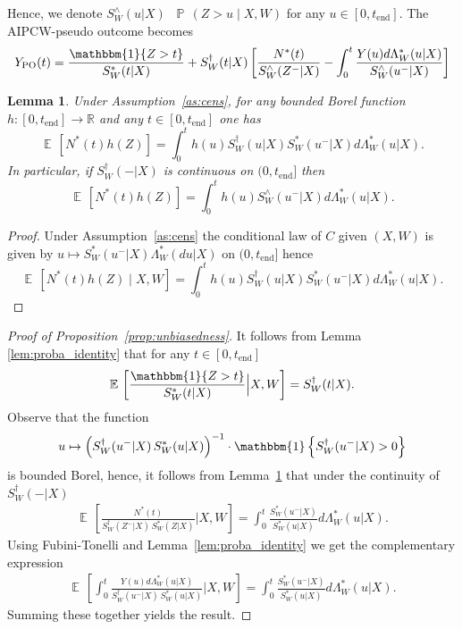 \documentclass{article}
\newtheorem{lemma}[theorem]{Lemma}
\DeclareMathOperator*{\eqdef }{\,\stackrel{\text{def}}{=}\,}
\DeclareMathOperator{\IDF}{\mathbbm{1}}%
\DeclareMathOperator{\EX}{\mathbb{E}\,}
\DeclareMathOperator{\PR}{\mathbb{P}\,}
\newcommand{\tend}{t_{\mathrm{end}}}
\newcommand{\R}{\mathbb{R}}
\newcommand{\YPO}{Y_{\mathrm{PO}}}
\begin{document}
Hence, we denote $S_W^{\wedge}(u|X) \eqdef \PR(Z > u \mid X,W)$ for any $u \in [0,\tend]$. The AIPCW-pseudo outcome becomes
\begin{align*}
\YPO(t) = \frac{\IDF\{Z > t\}}{S^*_W(t | X)} + S^\dagger_W(t | X) 
\left[ \frac{N^*(t) }{S^\wedge_W(Z^- | X)}
-  \int_{0}^{t} \frac{Y(u)  d\Lambda^*_W(u| X)}{S^\wedge_W(u^-| X)} \right] 
\end{align*}



\begin{lemma}\label{lem:expected_predictable_process}
Under Assumption~\ref{as:cens}, for any bounded Borel function $h:[0,\tend] \to \R$ and any $t \in [0,\tend]$ one has
\[ \EX[ N^*(t)h(Z)] = \int_0^t h(u) S_W^\dagger(u|X) S_W^*(u^- |X) d \Lambda_W^*(u|X).\]
In particular, if $S_{W}^\dagger(-|X)$ is continuous on $(0,\tend]$ then 
\[ \EX[ N^*(t)h(Z)] = \int_0^t h(u) S_W^\wedge(u^- |X) d \Lambda_W^*(u|X).\]
\end{lemma}

\begin{proof}
Under Assumption~\ref{as:cens} the conditional law of $C$ given $(X,W)$ is given by $u \mapsto S_W^*(u^-|X)\Lambda_W^*(du|X)$ on $(0,\tend]$ hence
\[ \EX[N^*(t) h(Z) \mid X,W] = \int_{0}^t h(u) S_W^\dagger(u|X) S_W^*(u^- |X) d\Lambda_W^*(u|X).\]
\end{proof}

\begin{proof}[Proof of Proposition~\ref{prop:unbiasedness}]
It follows from Lemma \ref{lem:proba_identity} that for any $t \in [0,\tend]$
\begin{align*}
\EX \left[ \frac{\IDF\{Z > t\}}{S^*_W(t|X)} \Big| X, W \right] = S_W^\dagger(t|X).
\end{align*}
Observe that the function  
\[ u \mapsto \left( S^\dagger_W(u^-|X) \, S^*_W(u|X) \right)^{-1} \cdot \IDF \left\{ S^\dagger_W(u^-|X) > 0 \right\} \]
is bounded Borel, hence, it follows from Lemma~\ref{lem:expected_predictable_process} that under the continuity of $S_{W}^\dagger(-|X)$ 
\begin{align*}
\EX \left[ \frac{N^*(t)}{S^\dagger_W(Z^-|X)\, S^*_W(Z|X)} \Big| X, W \right] = \int_0^t \frac{S_W^*(u^- |X) }{S^*_W(u|X)}  d \Lambda_W^*(u|X).
\end{align*}
Using Fubini-Tonelli and Lemma~\ref{lem:proba_identity} we get the complementary expression
\begin{align*}
\EX \left[ \int_0^t \frac{Y(u)  d\Lambda^*_W(u| X)}{S^\dagger_W(u^-| X) \, S^*_W(u| X)} \Big| X, W \right] =  \int_0^t \frac{S_W^*(u^- |X) }{S^*_W(u|X)}  d \Lambda_W^*(u|X).
\end{align*}
Summing these together yields the result.
\end{proof}
\end{document}
